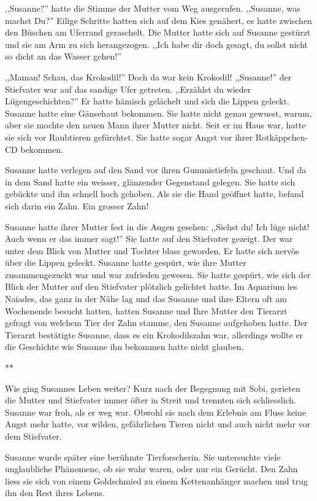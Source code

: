 \documentclass[11pt,titlepage,a5paper]{book}
\newcommand{\sterne}{\par{\centering ***\par}}
\begin{document}
,,Susanne?'' hatte die Stimme der Mutter vom Weg ausgerufen. ,,Susanne, was machst Du?'' Eilige Schritte hatten sich auf dem Kies genähert, es hatte zwischen den Büschen am Uferrand geraschelt. Die Mutter hatte sich auf Susanne gestürzt und sie am Arm zu sich herangezogen. ,,Ich habe dir doch gesagt, du sollst nicht so dicht an das Wasser gehen!''

,,Maman! Schau, das Krokodil!''
Doch da war kein Krokodil! ,,Susanne!'' der Stiefvater war auf das sandige Ufer getreten. ,,Erzählst du wieder Lügengeschichten?'' Er hatte hämisch gelächelt und sich die Lippen geleckt. Susanne hatte eine Gänsehaut bekommen. Sie hatte nicht genau gewusst, warum, aber  sie mochte den neuen Mann ihrer Mutter nicht. Seit er im Haus war, hatte sie sich vor Raubtieren gefürchtet. Sie hatte sogar Angst vor ihrer Rotkäppchen-CD bekommen. 

Susanne hatte verlegen auf den Sand vor ihren Gummistiefeln geschaut. Und da in dem Sand hatte ein weisser, glänzender Gegenstand gelegen. Sie hatte sich gebückte und ihn schnell hoch gehoben. Als sie die Hand geöffnet hatte, befand sich darin ein Zahn. Ein grosser Zahn!

Susanne hatte ihrer Mutter fest in die Augen gesehen: ,,Siehst du! Ich lüge nicht! Auch wenn er das immer sagt!'' Sie hatte auf den Stiefvater gezeigt. Der war unter dem Blick von Mutter und Tochter blass geworden. Er hatte sich nervös über die Lippen geleckt. Susanne hatte gespürt, wie ihre Mutter zusammengezuckt war und war zufrieden gewesen. Sie hatte gespürt, wie sich der Blick der Mutter auf den Stiefvater plötzlich gelichtet hatte.
Im Aquarium les Naiades, das ganz in der Nähe lag und das Susanne und ihre Eltern oft am Wochenende besucht hatten, hatten Susanne und Ihre Mutter den Tierarzt gefragt von welchem Tier der Zahn stamme, den Susanne aufgehoben hatte. Der Tierarzt bestätigte Susanne, dass es ein Krokodilszahn war, allerdings wollte er die Geschichte wie Susanne ihn bekommen hatte nicht glauben. 

\sterne

Wie ging Susannes Leben weiter? Kurz nach der Begegnung mit Sobi, gerieten die Mutter und Stiefvater immer öfter in Streit und trennten sich schliesslich. Susanne war froh, als er weg war. Obwohl sie nach dem Erlebnis am Fluss keine Angst mehr hatte, vor wilden, gefährlichen Tieren nicht und auch nicht mehr vor dem Stiefvater.

Susanne wurde später eine berühmte Tierforscherin. Sie untersuchte viele unglaubliche Phänomene, ob sie wahr waren, oder nur ein Gerücht. Den Zahn liess sie sich von einem Goldschmied zu einem Kettenanhänger machen und trug ihn den Rest ihres Lebens.
\end{document}
